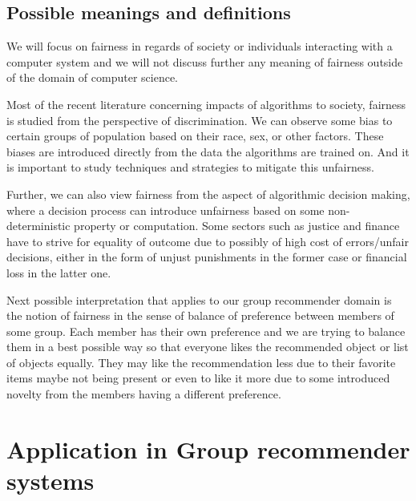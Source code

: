\subsection{Possible meanings and definitions}\label{subsec:02_general.possible_meanings}
We will focus on fairness in regards of society or individuals interacting with a computer system and we will not discuss further any meaning of fairness outside of the domain of computer science.

Most of the recent literature concerning impacts of algorithms to society, fairness is studied from the perspective of discrimination. We can observe some bias to certain groups of population based on their race, sex, or other factors. These biases are introduced directly from the data the algorithms are trained on. And it is important to study techniques and strategies to mitigate this unfairness.

Further, we can also view fairness from the aspect of algorithmic decision making, where a decision process can introduce unfairness based on some non-deterministic property or computation. Some sectors such as justice and finance have to strive for equality of outcome due to possibly of high cost of errors/unfair decisions, either in the form of unjust punishments in the former case or financial loss in the latter one.

Next possible interpretation that applies to our group recommender domain is the notion of fairness in the sense of balance of preference between members of some group. Each member has their own preference and we are trying to balance them in a best possible way so that everyone likes the recommended object or list of objects equally. They may like the recommendation less due to their favorite items maybe not being present or even to like it more due to some introduced novelty from the members having a different preference.





\section{Application in Group recommender systems} \label{sec:02_application_in_grs}

